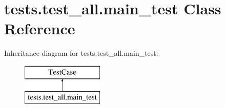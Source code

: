 \hypertarget{classtests_1_1test__all_1_1main__test}{\section{tests.\-test\-\_\-all.\-main\-\_\-test Class Reference}
\label{classtests_1_1test__all_1_1main__test}
}
Inheritance diagram for tests.\-test\-\_\-all.\-main\-\_\-test\-:\begin{figure}[H]
\begin{center}
\leavevmode
\includegraphics[height=2.000000cm]{classtests_1_1test__all_1_1main__test}
\end{center}
\end{figure}
